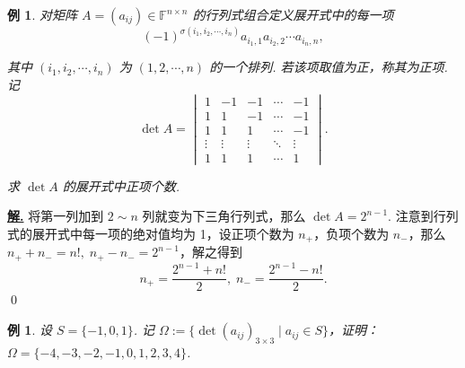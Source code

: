 \documentclass[10pt,openany]{article}
\theoremstyle{thmstyle} %
\theoremstyle{defstyle} %
\theoremstyle{prostyle} %
\theoremstyle{exastyle}
\newtheorem{example}[theorem]{例}
\theoremstyle{remstyle}
\newenvironment{solution}{\par\underline{\textbf{解.}} \;\fangsong}{\qed\par}
\newcommand{\F}{\mathbb{F}}
\newcommand{\n}{^{n \times n}}
\begin{document}
\begin{example}
	对矩阵 \( A=(a_{ij}) \in \F\n \) 的行列式组合定义展开式中的每一项
	\[
	(-1)^{\sigma(i_1,i_2,\cdots,i_n)} a_{i_1,1} a_{i_2,2}\cdots a_{i_n,n},
	\]
	
	其中 \( (i_1,i_2,\cdots,i_n) \) 为 \( (1,2,\cdots,n) \) 的一个排列. 若该项取值为正，称其为正项. 记
	\[
	\det A=\begin{vmatrix}
		1 & -1 & -1 & \cdots & -1 \\
		1 & 1 & -1 & \cdots & -1 \\
		1 & 1 & 1 & \cdots & -1 \\
		\vdots & \vdots & \vdots & \ddots & \vdots \\
		1 & 1 & 1 & \cdots & 1
	\end{vmatrix}.
	\]
	
	求 \( \det A \) 的展开式中正项个数.
\end{example}

\begin{solution}
	将第一列加到 \( 2 \sim n \) 列就变为下三角行列式，那么 \( \det A=2^{n-1} \). 注意到行列式的展开式中每一项的绝对值均为 1，设正项个数为 \( n_+ \)，负项个数为 \( n_{-} \)，那么 \( n_+ + n_{-}=n!, \; n_+ - n_{-}=2^{n-1} \)，解之得到 
	\[ n_+= \frac{2^{n-1}+n!}{2}, \; n_{-}=\frac{2^{n-1}-n!}{2}. \]
\end{solution}


\begin{example}
	设 \( S=\{-1,0,1\} \). 记 \( \Omega:=\{ \det(a_{ij})_{3 \times 3} \mid a_{ij} \in S \} \)，证明：\( \Omega=\{-4,-3,-2,-1,0,1,2,3,4 \} \).
\end{example}
\end{document}
